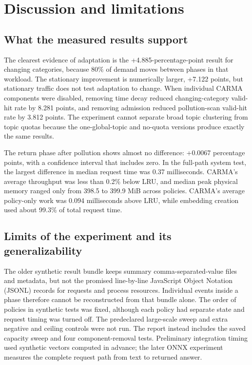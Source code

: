 \documentclass[10pt,letterpaper]{article}
\begin{document}
\section{Discussion and limitations}

\subsection{What the measured results support}

The clearest evidence of adaptation is the +4.885-percentage-point result for
changing categories, because 80\% of demand moves between phases in that
workload. The stationary improvement is numerically larger, +7.122 points, but
stationary traffic does not test adaptation to change. When individual CARMA
components were disabled, removing time decay reduced changing-category
valid-hit rate by 8.281 points, and removing admission reduced pollution-scan
valid-hit rate by 3.812 points. The experiment cannot separate broad topic
clustering from topic quotas because the one-global-topic and no-quota versions
produce exactly the same results.

The return phase after pollution shows almost no difference: +0.0067 percentage
points, with a confidence interval that includes zero. In the full-path system
test, the largest difference in median request time was 0.37 milliseconds.
CARMA's average throughput was less than 0.2\% below LRU, and median peak
physical memory ranged only from 398.5 to 399.9 MiB across policies. CARMA's
average policy-only work was 0.094 milliseconds above LRU, while embedding
creation used about 99.3\% of total request time.

\subsection{Limits of the experiment and its generalizability}

The older synthetic result bundle keeps summary comma-separated-value files
and metadata, but not the promised line-by-line JavaScript Object Notation
(JSONL) records for requests and process resources. Individual events inside a
phase therefore cannot be reconstructed from that bundle alone. The order of
policies in synthetic tests was fixed, although each policy had separate state
and request timing was turned off. The predeclared large-scale sweep and extra
negative and ceiling controls were not run. The report instead includes the
saved capacity sweep and four component-removal tests. Preliminary integration
timing used synthetic vectors computed in advance; the later ONNX experiment
measures the complete request path from text to returned answer.
\end{document}
